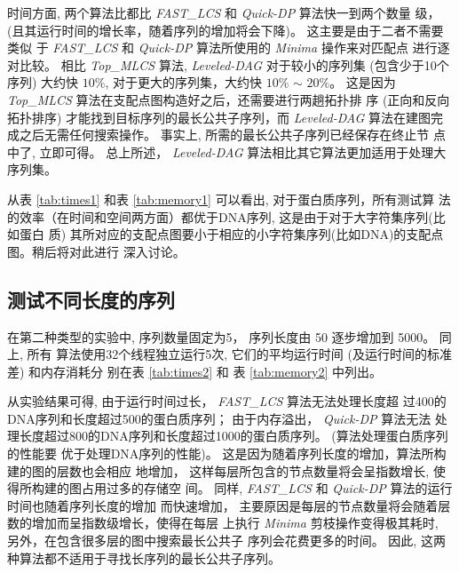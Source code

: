 时间方面, 两个算法比都比 \emph{FAST\_LCS} 和 \emph{Quick-DP} 算法快一到两个数量
级，(且其运行时间的增长率，随着序列的增加将会下降)。 这主要是由于二者不需要类似
于 \emph{FAST\_LCS} 和 \emph{Quick-DP} 算法所使用的 \emph{Minima} 操作来对匹配点
进行逐对比较。 相比 \emph{Top\_MLCS} 算法, \emph{Leveled-DAG} 对于较小的序列集
(包含少于10个序列) 大约快 $10\%$, 对于更大的序列集，大约快 $10\%$ $\sim$
$20\%$。 这是因为 \emph{Top\_MLCS} 算法在支配点图构造好之后，还需要进行两趟拓扑排
序 (正向和反向拓扑排序) 才能找到目标序列的最长公共子序列，而 \emph{Leveled-DAG}
算法在建图完成之后无需任何搜索操作。 事实上, 所需的最长公共子序列已经保存在终止节
点中了, 立即可得。 总上所述， \emph{Leveled-DAG} 算法相比其它算法更加适用于处理大
序列集。

从表 \ref{tab:times1} 和表 \ref{tab:memory1} 可以看出, 对于蛋白质序列，所有测试算
法的效率（在时间和空间两方面）都优于DNA序列, 这是由于对于大字符集序列(比如蛋白
质) 其所对应的支配点图要小于相应的小字符集序列(比如DNA)的支配点图。稍后将对此进行
深入讨论。


\subsection{测试不同长度的序列}
\label{sec:times2}

在第二种类型的实验中, 序列数量固定为5， 序列长度由 50 逐步增加到 5000。 同上, 所有
算法使用32个线程独立运行5次, 它们的平均运行时间 (及运行时间的标准差) 和内存消耗分
别在表 \ref{tab:times2} 和 表 \ref{tab:memory2} 中列出。

从实验结果可得, 由于运行时间过长， \emph{FAST\_LCS} 算法无法处理长度超
过400的DNA序列和长度超过500的蛋白质序列； 由于内存溢出， \emph{Quick-DP} 算法无法
处理长度超过800的DNA序列和长度超过1000的蛋白质序列。 (算法处理蛋白质序列的性能要
优于处理DNA序列的性能)。 这是因为随着序列长度的增加，算法所构建的图的层数也会相应
地增加， 这样每层所包含的节点数量将会呈指数增长, 使得所构建的图占用过多的存储空
间。 同样, \emph{FAST\_LCS} 和 \emph{Quick-DP} 算法的运行时间也随着序列长度的增加
而快速增加， 主要原因是每层的节点数量将会随着层数的增加而呈指数级增长，使得在每层
上执行 \emph{Minima} 剪枝操作变得极其耗时, 另外，在包含很多层的图中搜索最长公共子
序列会花费更多的时间。 因此, 这两种算法都不适用于寻找长序列的最长公共子序列。

